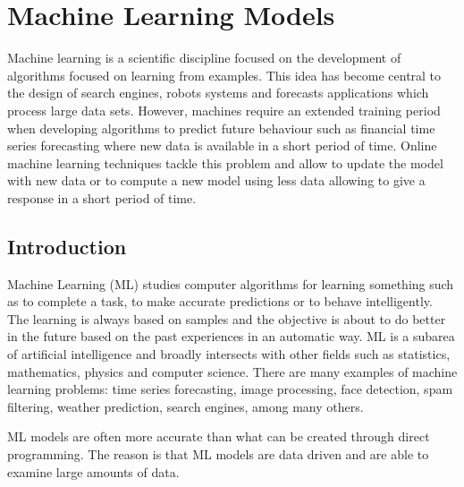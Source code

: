 \chapter{Machine Learning Models}
Machine learning is a scientific discipline focused on the development of algorithms focused on learning from examples. This idea has become central to the design of search engines, robots systems and forecasts applications which process large data sets. However, machines require an extended training period when developing algorithms to predict future behaviour such as financial time series forecasting where new data is available in a short period of time.  Online machine learning techniques tackle this problem and allow to update the model with new data or to compute a new model using less data allowing to give a response in a short period of time.

\vspace{0.5cm} 

\section{Introduction}
Machine Learning (ML) studies computer algorithms for learning
something such as to complete a task, to make accurate predictions or to behave intelligently. The learning is always based on samples and the objective is about to do better in the future based on the past experiences in an automatic way. ML is a subarea of artificial intelligence and broadly intersects with other fields such as statistics, mathematics, physics and computer science. 
There are many examples of machine learning problems: time series forecasting, image processing, face detection, spam filtering, weather prediction, search engines, among many others.

ML models are often more accurate than what can be created through direct programming. The reason is that ML models are data driven and are able to examine large amounts of data.

